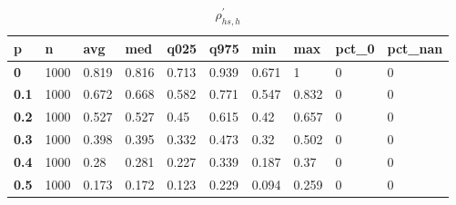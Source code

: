 \begin{table}[h]
 \centering 
\footnotesize
\caption{$\rho_{hs,h}^\prime $}
\label{tab:alphahsh}
\begin{tabular}[h]{|l|l|l|l|l|l|l|l|l|l|
    } \hline
\textbf{ p} & \textbf{ n} & \textbf{ avg} & \textbf{ med} & \textbf{ q025} & \textbf{ q975} & \textbf{ min} & \textbf{ max} & \textbf{ pct\_0} & \textbf{ pct\_nan}
    \\ \hline
  \textbf{  0} & 1000 & 0.819 & 0.816 & 0.713 & 0.939 & 0.671 &     1 & 0 & 0
    \\ \hline
  \textbf{0.1} & 1000 & 0.672 & 0.668 & 0.582 & 0.771 & 0.547 & 0.832 & 0 & 0
    \\ \hline
  \textbf{0.2} & 1000 & 0.527 & 0.527 &  0.45 & 0.615 &  0.42 & 0.657 & 0 & 0
    \\ \hline
  \textbf{0.3} & 1000 & 0.398 & 0.395 & 0.332 & 0.473 &  0.32 & 0.502 & 0 & 0
    \\ \hline
  \textbf{0.4} & 1000 &  0.28 & 0.281 & 0.227 & 0.339 & 0.187 &  0.37 & 0 & 0
    \\ \hline
  \textbf{0.5} & 1000 & 0.173 & 0.172 & 0.123 & 0.229 & 0.094 & 0.259 & 0 & 0
    \\ \hline
 \end{tabular}
 \end{table}
